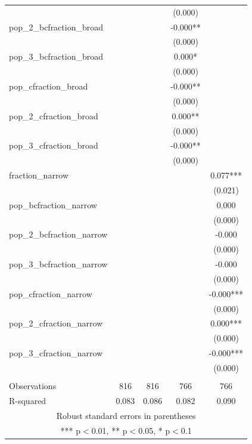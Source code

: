 \documentclass[]{article}
\begin{document}
\begin{tabular}{lcccc}
 &  &  & (0.000) &  \\
pop\_2\_bcfraction\_broad &  &  & -0.000** &  \\
 &  &  & (0.000) &  \\
pop\_3\_bcfraction\_broad &  &  & 0.000* &  \\
 &  &  & (0.000) &  \\
pop\_cfraction\_broad &  &  & -0.000** &  \\
 &  &  & (0.000) &  \\
pop\_2\_cfraction\_broad &  &  & 0.000** &  \\
 &  &  & (0.000) &  \\
pop\_3\_cfraction\_broad &  &  & -0.000** &  \\
 &  &  & (0.000) &  \\
fraction\_narrow &  &  &  & 0.077*** \\
 &  &  &  & (0.021) \\
pop\_bcfraction\_narrow &  &  &  & 0.000 \\
 &  &  &  & (0.000) \\
pop\_2\_bcfraction\_narrow &  &  &  & -0.000 \\
 &  &  &  & (0.000) \\
pop\_3\_bcfraction\_narrow &  &  &  & -0.000 \\
 &  &  &  & (0.000) \\
pop\_cfraction\_narrow &  &  &  & -0.000*** \\
 &  &  &  & (0.000) \\
pop\_2\_cfraction\_narrow &  &  &  & 0.000*** \\
 &  &  &  & (0.000) \\
pop\_3\_cfraction\_narrow &  &  &  & -0.000*** \\
 &  &  &  & (0.000) \\
 &  &  &  &  \\
Observations & 816 & 816 & 766 & 766 \\
 R-squared & 0.083 & 0.086 & 0.082 & 0.090 \\ \hline
\multicolumn{5}{c}{ Robust standard errors in parentheses} \\
\multicolumn{5}{c}{ *** p$<$0.01, ** p$<$0.05, * p$<$0.1} \\
\end{tabular}
\end{document}
